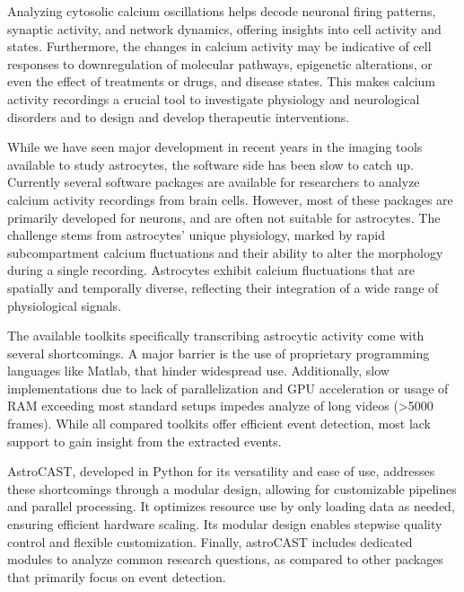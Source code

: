 Analyzing cytosolic calcium oscillations helps decode neuronal firing patterns, synaptic activity, and network dynamics, offering insights into cell activity and states\citep{del_negro_sodium_2005,grienberger_imaging_2012,dombeck_imaging_2007}. Furthermore, the changes in calcium activity may be indicative of cell responses to downregulation of molecular pathways, epigenetic alterations, or even the effect of treatments or drugs, and disease states\citep{lines_astrocytes_2020,miller_calcium_2023,robil_glioblastoma_2015,huang_vitro_2013,britti_tau_2020,zhang_estrogen_2010}. This makes calcium activity recordings a crucial tool to investigate physiology and neurological disorders and to design and develop therapeutic interventions.

While we have seen major development in recent years in the imaging tools available to study astrocytes, the software side has been slow to catch up\citep{gorzo_photonics_2022,aryal_er-gcamp6f_2022,stobart_cortical_2018}. Currently several software packages are available for researchers to analyze calcium activity recordings from brain cells. However, most of these packages are primarily developed for neurons, and are often not suitable for astrocytes. The challenge stems from astrocytes' unique physiology, marked by rapid subcompartment calcium fluctuations\citep{stobart_long-term_2018,curreli_complementary_2022} and their ability to alter the morphology during a single recording\citep{anders_epileptic_2024,baorto_astrocyte_1992}. Astrocytes exhibit calcium fluctuations that are spatially and temporally diverse, reflecting their integration  of a wide range of physiological signals\citep{semyanov_making_2020,smedler_frequency_2014,denizot_simulation_2019,papouin_astrocytic_2017,bazargani_astrocyte_2016}.

The available toolkits specifically transcribing astrocytic activity come with several shortcomings. A major barrier is the use of proprietary programming languages like Matlab, that hinder widespread use. Additionally, slow implementations due to lack of parallelization and GPU acceleration or usage of RAM exceeding most standard setups impedes analyze of long videos (>5000 frames). While all compared toolkits offer efficient event detection, most lack support to gain insight from the extracted events.

AstroCAST, developed in Python for its versatility and ease of use, addresses these shortcomings through a modular design, allowing for customizable pipelines and parallel processing.  It optimizes resource use by only loading data as needed, ensuring efficient hardware scaling. Its modular design enables stepwise quality control and flexible customization. Finally, astroCAST includes dedicated modules to analyze common research questions, as compared to other packages that primarily focus on event detection.

